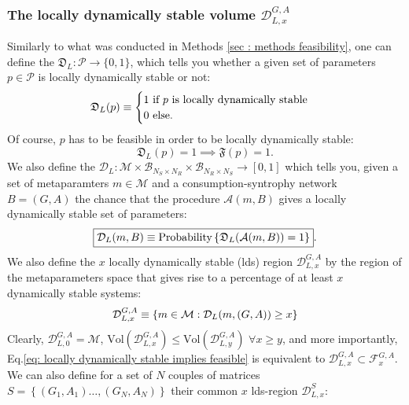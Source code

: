 \documentclass[12pt, titlepage]{report}
\begin{document}
\subsubsection{The locally dynamically stable volume $\mathcal{D}^{G,A}_{L,x}$} \label{sec: dynamical stability methods locally dynamically stable region}
Similarly to what was conducted in Methods \ref{sec : methods feasibility}, one can define the  $\mathfrak{D}_L: \mathcal{P} \rightarrow \{
0,1\}$, which tells you whether a given set of parameters $p \in \mathcal{P}$ is locally dynamically stable or not:
\begin{equation}
\mathfrak{D}_L(p)\equiv\begin{cases}
1 \text{ if } p \text{ is locally dynamically stable} \\
0 \text{ else.}
\end{cases}
\end{equation}
Of course, $p$ has to be feasible in order to be locally dynamically stable:
\begin{equation}
\mathfrak{D}_L(p)=1 \implies \mathfrak{F}(p)=1. \label{eq: locally dynamically stable implies feasible}
\end{equation}
We also define the  $\mathcal{D}_L: \mathcal{M} \times \mathcal{B}_{N_S \times N_R} \times \mathcal{B}_{N_R \times N_S} \rightarrow [0,1]$ which tells you, given a set of metaparamters $m \in \mathcal{M}$ and a consumption-syntrophy network $B=(G,A)$ the chance that the procedure $\mathcal{A}(m,B)$ gives a locally dynamically stable set of parameters:
\begin{equation}
\boxed{\mathcal{D}_L(m, B)\equiv\text{Probability}\left\{\mathfrak{D}_L(\mathcal{A}(m, B))=1\right\}}.
\end{equation}
We also define the $x$ locally dynamically stable (lds) region $\mathcal{D}_{L,x}^{G,A}$ by the region of the metaparameters space that gives rise to a percentage of at least $x$ dynamically stable systems:
\begin{equation}
\mathcal{D}_{L,x}^{G,A} \equiv \left\{m \in \mathcal{M}: \mathcal{D}_L(m, (G,A)) \geq x \right\}
\end{equation}
Clearly, $\mathcal{D}_{L,0}^{G,A}=\mathcal{M}$, $\text{Vol}\left(\mathcal{D}_{L,x}^{G,A}\right) \leq \text{Vol}\left(\mathcal{D}_{L,y}^{G,A}\right)$ $\forall x \geq y$, and more importantly, Eq.\eqref{eq: locally dynamically stable implies feasible} is equivalent to $\mathcal{D}_{L,x}^{G,A} \subset \mathcal{F}_x^{G,A}$. We can also define for a set of $N$ couples of matrices $S=\left\{(G_1, A_1) \dots, (G_N, A_N)\right\}$ their common $x$ lds-region $\mathcal{D}_{L,x}^S$:
\end{document}
